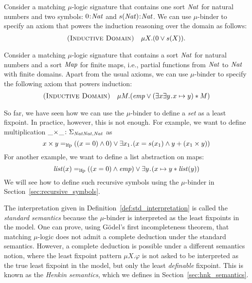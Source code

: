 \documentclass{amsart}
\begin{document}
\begin{example}
Consider a matching $\mu$-logic signature that contains
one sort $\mathit{Nat}$ for natural numbers and two symbols:
$0 \mathbin{\!:\!} \mathit{Nat}$ and $s(\mathit{Nat}) \mathbin{\!:\!} \mathit{Nat}$.
We can use $\mu$-binder to specify an axiom that powers the induction reasoning
over the domain as follows:
\begin{align*}
\textsc{(Inductive Domain)} \quad
\mu X . (0 \vee s(X)).
\end{align*}
\end{example}

\begin{example}
Consider a matching $\mu$-logic signature that contains
a sort $\mathit{Nat}$ for natural numbers and a sort $\mathit{Map}$ for finite maps,
i.e., partial functions from $\mathit{Nat}$ to $\mathit{Nat}$ with finite domains. 
Apart from the usual axioms, we can use $\mu$-binder to specify
the following axiom that powers induction:
\begin{align*}
\textsc{(Inductive Domain)} \quad
\mu M . (\mathit{emp} \vee (\exists x \exists y \mathbin{\!.\!} x \mapsto y) \mathbin{*} M)
\end{align*}
\end{example}

So far, we have seen how we can use the $\mu$-binder to
define a \emph{set} as a least fixpoint. 
In practice, however, this is not enough. 
For example, we want to define multiplication 
$\_ \! \times \! \_ \colon \Sigma_{\mathit{Nat}\mathit{Nat},\mathit{Nat}}$ as
$$
x \times y =_{\mathrm{lfp}} ((x = 0) \wedge 0) 
\vee \exists x_1 \mathbin{\!.\!} (x = s(x_1) \wedge y + (x_1 \times y))
$$
For another example, we want to define a list abstraction on maps:
$$
\mathit{list}(x) =_{\mathrm{lfp}} ((x = 0) \wedge \mathit{emp}) \vee \exists y \mathbin{\!.\!} (x \mapsto y \mathbin{*} \mathit{list}(y))
$$
We will see how to define such recursive symbols using the $\mu$-binder
in Section~\ref{sec:recursive_symbols}.

The interpretation given in Definition~\ref{def:std_interpretation}
is called the \emph{standard semantics} because the $\mu$-binder
is interpreted as the least fixpoints in the model.
One can prove, using G\"odel's first incompleteness theorem,
that matching $\mu$-logic 
does not admit a complete deduction under the standard semantics.
However, a complete deduction is possible under a different semantics notion,
where the least fixpoint pattern 
$\mu X . \varphi$ 
is not asked to be interpreted as
the true least fixpoint in the model, but only the least \emph{definable} fixpoint.
This is known as the \emph{Henkin semantics}, which we defines in
Section~\ref{sec:hnk_semantics}.
\end{document}
